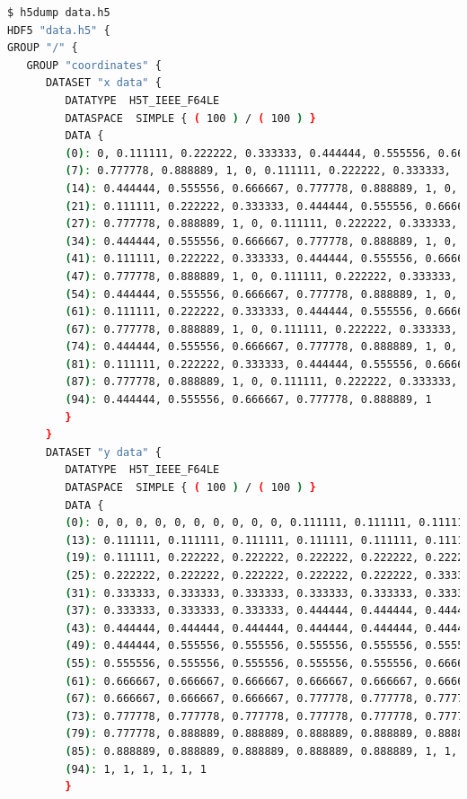 \documentclass[12 pt, final]{article}
\begin{document}
\begin{itemize}
\begin{lstlisting}[language=bash,escapechar=\%]
$ h5dump data.h5
HDF5 "data.h5" {
GROUP "/" {
   GROUP "coordinates" {
      DATASET "x data" {
         DATATYPE  H5T_IEEE_F64LE
         DATASPACE  SIMPLE { ( 100 ) / ( 100 ) }
         DATA {
         (0): 0, 0.111111, 0.222222, 0.333333, 0.444444, 0.555556, 0.666667,
         (7): 0.777778, 0.888889, 1, 0, 0.111111, 0.222222, 0.333333,
         (14): 0.444444, 0.555556, 0.666667, 0.777778, 0.888889, 1, 0,
         (21): 0.111111, 0.222222, 0.333333, 0.444444, 0.555556, 0.666667,
         (27): 0.777778, 0.888889, 1, 0, 0.111111, 0.222222, 0.333333,
         (34): 0.444444, 0.555556, 0.666667, 0.777778, 0.888889, 1, 0,
         (41): 0.111111, 0.222222, 0.333333, 0.444444, 0.555556, 0.666667,
         (47): 0.777778, 0.888889, 1, 0, 0.111111, 0.222222, 0.333333,
         (54): 0.444444, 0.555556, 0.666667, 0.777778, 0.888889, 1, 0,
         (61): 0.111111, 0.222222, 0.333333, 0.444444, 0.555556, 0.666667,
         (67): 0.777778, 0.888889, 1, 0, 0.111111, 0.222222, 0.333333,
         (74): 0.444444, 0.555556, 0.666667, 0.777778, 0.888889, 1, 0,
         (81): 0.111111, 0.222222, 0.333333, 0.444444, 0.555556, 0.666667,
         (87): 0.777778, 0.888889, 1, 0, 0.111111, 0.222222, 0.333333,
         (94): 0.444444, 0.555556, 0.666667, 0.777778, 0.888889, 1
         }
      }
      DATASET "y data" {
         DATATYPE  H5T_IEEE_F64LE
         DATASPACE  SIMPLE { ( 100 ) / ( 100 ) }
         DATA {
         (0): 0, 0, 0, 0, 0, 0, 0, 0, 0, 0, 0.111111, 0.111111, 0.111111,
         (13): 0.111111, 0.111111, 0.111111, 0.111111, 0.111111, 0.111111,
         (19): 0.111111, 0.222222, 0.222222, 0.222222, 0.222222, 0.222222,
         (25): 0.222222, 0.222222, 0.222222, 0.222222, 0.222222, 0.333333,
         (31): 0.333333, 0.333333, 0.333333, 0.333333, 0.333333, 0.333333,
         (37): 0.333333, 0.333333, 0.333333, 0.444444, 0.444444, 0.444444,
         (43): 0.444444, 0.444444, 0.444444, 0.444444, 0.444444, 0.444444,
         (49): 0.444444, 0.555556, 0.555556, 0.555556, 0.555556, 0.555556,
         (55): 0.555556, 0.555556, 0.555556, 0.555556, 0.555556, 0.666667,
         (61): 0.666667, 0.666667, 0.666667, 0.666667, 0.666667, 0.666667,
         (67): 0.666667, 0.666667, 0.666667, 0.777778, 0.777778, 0.777778,
         (73): 0.777778, 0.777778, 0.777778, 0.777778, 0.777778, 0.777778,
         (79): 0.777778, 0.888889, 0.888889, 0.888889, 0.888889, 0.888889,
         (85): 0.888889, 0.888889, 0.888889, 0.888889, 0.888889, 1, 1, 1, 1,
         (94): 1, 1, 1, 1, 1, 1
         }

\end{lstlisting}
\end{itemize}
\end{document}
